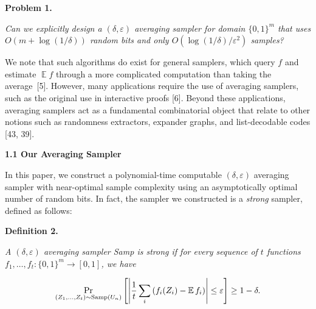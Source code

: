 

\par\medskip\noindent\textbf{
\textbf{Problem 1}\textbf{.}
}\par



\emph{Can we explicitly design a $(\delta,\varepsilon)$ averaging sampler for domain $\{0,1\}^{m}$ that uses $O(m+\log(1/\delta))$ random bits and only $O(\log(1/\delta)/\varepsilon^{2})$ samples?}\par






We note that such algorithms do exist for general samplers, which query $f$ and estimate $\operatorname*{\mathbb{E}}f$ through a more complicated computation than taking the average [5].
However, many applications require the use of averaging samplers, such as the original use in interactive proofs [6].
Beyond these applications, averaging samplers act as a fundamental combinatorial object that relate to other notions such as randomness extractors, expander graphs, and list-decodable codes [43, 39].\par




\par\medskip\noindent\textbf{
1.1 Our Averaging Sampler}\par




In this paper, we construct a polynomial-time computable $(\delta,\varepsilon)$ averaging sampler with near-optimal sample complexity using an asymptotically optimal number of random bits. In fact, the sampler we constructed is a \emph{strong} sampler, defined as follows:\par





\par\medskip\noindent\textbf{
\textbf{Definition 2}\textbf{.}
}\par



\emph{A $(\delta,\varepsilon)$ averaging sampler Samp is strong if
for every sequence of $t$ functions $f_{1},\dots,f_{t}:\{0,1\}^{m}\to[0,1]$, we have}\par


\[\begin{gathered}
\Pr_{(Z_{1},\dots,Z_{t})\sim\textup{{Samp}}(U_{n})}\left[\left|\frac{1}{t}\sum_{i}\left(f_{i}(Z_{i})-\operatorname*{\mathbb{E}}f_{i}\right)\right|\leq\varepsilon\right]\geq 1-\delta.
\end{gathered}\]



